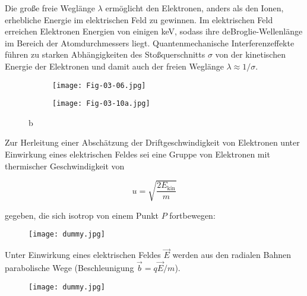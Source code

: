Die große freie Weglänge $\lambda$ ermöglicht den Elektronen, anders als den Ionen, erhebliche
Energie im elektrischen Feld zu gewinnen. Im elektrischen Feld erreichen Elektronen Energien von
einigen keV, sodass ihre deBroglie-Wellenlänge im Bereich der Atomdurchmessers liegt.
Quantenmechanische Interferenzeffekte führen zu starken Abhängigkeiten des Stoßquerschnitts $\sigma$
von der kinetischen Energie der Elektronen und damit auch der freien Weglänge $\lambda\approx
1/\sigma$.


\begin{figure}[htbp]
	\begin{minipage}[b]{0.65\textwidth}
		\begin{figure}[H]
		\centering
		\texttt{[image: Fig-03-06.jpg]}
		\end{figure}
	\end{minipage}
	\hspace{0.5cm}
	\begin{minipage}[b]{0.25\textwidth}
		\begin{figure}[H]
		\centering
		\texttt{[image: Fig-03-10a.jpg]}
		\end{figure}
	\end{minipage}
	\caption{b}
	\label{rekristall} 
\end{figure}

Zur Herleitung einer Abschätzung der Driftgeschwindigkeit von Elektronen unter Einwirkung eines
elektrischen Feldes sei eine Gruppe von Elektronen mit thermischer Geschwindigkeit von

\[u=\sqrt{\frac{2E_{\text{kin}}}{m}}  \]

gegeben, die sich isotrop von einem Punkt $P$ fortbewegen:

\begin{figure}[H]
	\centering
	\texttt{[image: dummy.jpg]}
\end{figure}

Unter Einwirkung eines elektrischen Feldes $\vec{E}$ werden aus den radialen Bahnen parabolische
Wege (Beschleunigung $\vec{b}=q\vec{E}/m$).

\begin{figure}[H]
	\centering
	\texttt{[image: dummy.jpg]}
\end{figure}

